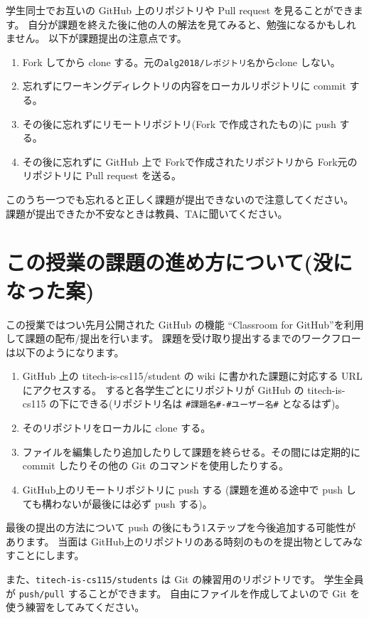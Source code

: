 \documentclass[a4paper,11pt, article]{memoir}
\begin{document}
学生同士でお互いの GitHub 上のリポジトリや Pull request を見ることができます。
自分が課題を終えた後に他の人の解法を見てみると、勉強になるかもしれません。
以下が課題提出の注意点です。
\begin{enumerate}
\item Fork してから clone する。元の\texttt{alg2018/レポジトリ名}からclone しない。
\item 忘れずにワーキングディレクトリの内容をローカルリポジトリに commit する。
\item その後に忘れずにリモートリポジトリ(Fork で作成されたもの)に push する。
\item その後に忘れずに GitHub 上で Forkで作成されたリポジトリから Fork元のリポジトリに Pull request を送る。
\end{enumerate}
このうち一つでも忘れると正しく課題が提出できないので注意してください。
課題が提出できたか不安なときは教員、TAに聞いてください。



\section{この授業の課題の進め方について(没になった案)}
この授業ではつい先月公開された GitHub の機能 ``Classroom for GitHub''を利用して課題の配布/提出を行います。
課題を受け取り提出するまでのワークフローは以下のようになります。
\begin{enumerate}
\item GitHub 上の titech-is-cs115/student の wiki に書かれた課題に対応する URL にアクセスする。
すると各学生ごとにリポジトリが GitHub の titech-is-cs115 の下にできる(リポジトリ名は \verb|#課題名#-#ユーザー名#| となるはず)。
\item そのリポジトリをローカルに clone する。
\item ファイルを編集したり追加したりして課題を終らせる。その間には定期的に commit したりその他の Git のコマンドを使用したりする。
\item GitHub上のリモートリポジトリに push する (課題を進める途中で push しても構わないが最後には必ず push する)。
\end{enumerate}
最後の提出の方法について push の後にもう1ステップを今後追加する可能性があります。
当面は GitHub上のリポジトリのある時刻のものを提出物としてみなすことにします。

また、\texttt{titech-is-cs115/students} は Git の練習用のリポジトリです。
学生全員が \texttt{push/pull} することができます。
自由にファイルを作成してよいので Git を使う練習をしてみてください。
\fi
\end{document}
